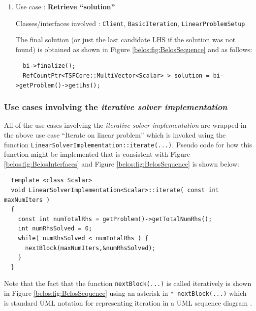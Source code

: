 \documentclass[pdf,ps2pdf,11pt]{SANDreport}
\begin{document}
\begin{enumerate}
{}\item Use case : \textbf{Retrieve ``solution''}

{}\noindent{}Classes/interfaces involved : {}\texttt{Client},
{}\texttt{Basic\-Iteration}, {}\texttt{Linear\-Problem\-Setup}

The final solution (or just the last candidate LHS if the solution was
not found) is obtained as shown in Figure
{}\ref{belos:fig:BelosSequence} and as follows:

{\scriptsize\begin{verbatim}
  bi->finalize();
  RefCountPtr<TSFCore::MultiVector<Scalar> > solution = bi->getProblem()->getLhs();
\end{verbatim}}

\end{enumerate}

\subsubsection*{Use cases involving the {}\textit{iterative solver implementation}}

All of the use cases involving the {}\textit{iterative solver
implementation} are wrapped in the above use case ``Iterate on linear
problem'' which is invoked using the function
{}\texttt{Linear\-Solver\-Implementation::\-iterate(...)}.  Pseudo
code for how this function might be implemented that is consistent
with Figure {}\ref{belos:fig:BelosInterfaces} and Figure
{}\ref{belos:fig:BelosSequence} is shown below:

{\scriptsize\begin{verbatim}
  template <class Scalar>
  void LinearSolverImplementation<Scalar>::iterate( const int maxNumIters )
  { 
    const int numTotalRhs = getProblem()->getTotalNumRhs();
    int numRhsSolved = 0;
    while( numRhsSolved < numTotalRhs ) {
      nextBlock(maxNumIters,&numRhsSolved);
    }
  }
\end{verbatim}}

Note that the fact that the function {}\texttt{nextBlock(...)} is
called iteratively is shown in Figure {}\ref{belos:fig:BelosSequence}
using an asterisk in {}\texttt{* nextBlock(...)} which is standard UML
notation for representing iteration in a UML sequence diagram
{}\cite{ref:uml_distilled_2nd_ed}.
\end{document}
